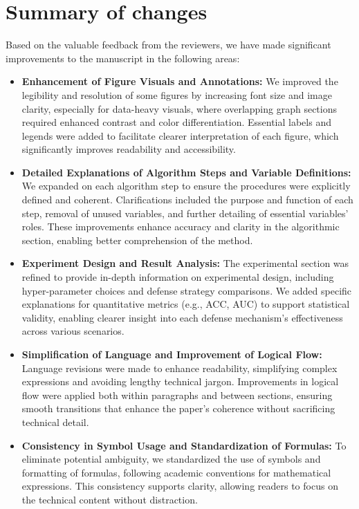 \documentclass[a4paper,twoside,11pt,dvipsnames]{reviewresponse}
\begin{document}
\section{Summary of changes}
Based on the valuable feedback from the reviewers, we have made significant improvements to the manuscript in the following areas:
\color{red}
\begin{itemize}

\item \textbf{Enhancement of Figure Visuals and Annotations:} We improved the legibility and resolution of some figures by increasing font size and image clarity, especially for data-heavy visuals, where overlapping graph sections required enhanced contrast and color differentiation. Essential labels and legends were added to facilitate clearer interpretation of each figure, which significantly improves readability and accessibility.

\item \textbf{Detailed Explanations of Algorithm Steps and Variable Definitions:} We expanded on each algorithm step to ensure the procedures were explicitly defined and coherent. Clarifications included the purpose and function of each step, removal of unused variables, and further detailing of essential variables’ roles. These improvements enhance accuracy and clarity in the algorithmic section, enabling better comprehension of the method.

\item \textbf{Experiment Design and Result Analysis:} The experimental section was refined to provide in-depth information on experimental design, including hyper-parameter choices and defense strategy comparisons. We added specific explanations for quantitative metrics (e.g., ACC, AUC) to support statistical validity, enabling clearer insight into each defense mechanism's effectiveness across various scenarios.

\item \textbf{Simplification of Language and Improvement of Logical Flow:} Language revisions were made to enhance readability, simplifying complex expressions and avoiding lengthy technical jargon. Improvements in logical flow were applied both within paragraphs and between sections, ensuring smooth transitions that enhance the paper’s coherence without sacrificing technical detail.

\item \textbf{Consistency in Symbol Usage and Standardization of Formulas:} To eliminate potential ambiguity, we standardized the use of symbols and formatting of formulas, following academic conventions for mathematical expressions. This consistency supports clarity, allowing readers to focus on the technical content without distraction.


\end{itemize}
\end{document}
